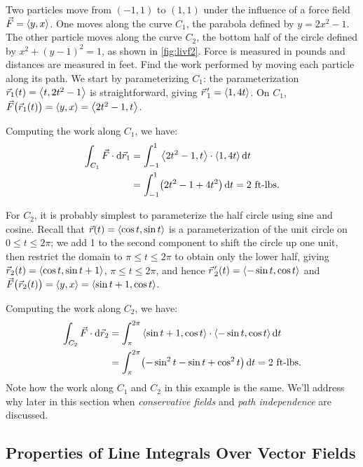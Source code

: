 \begin{example}\label{ex_livf2}%
Two particles move from $(-1,1)$ to $(1,1)$ under the influence of a force field $\vec F =\left\langle y,x\right\rangle$. One moves along the curve $C_1$, the parabola defined by $y = 2x^2-1$. The other particle moves along the curve $C_2$, the bottom half of the circle defined by $x^2+(y-1)^2=1$, as shown in \autoref{fig:livf2}. Force is measured in pounds and distances are measured in feet. Find the work performed by moving each particle along its path.
\solution
We start by parameterizing $C_1$: the parameterization $\vec r_1(t) =\left\langle t,2t^2-1\right\rangle$ is straightforward, giving $\vec r\hskip1.25pt '_1 =\left\langle 1,4t\right\rangle$. On $C_1$, $\vec F\bigl(\vec r_1(t)\bigr) =\left\langle y,x\right\rangle=\left\langle 2t^2-1,t\right\rangle$.

Computing the work along $C_1$, we have:
\begin{align*}
	\int_{C_1} \vec F\cdot\operatorname{d}\!\vec r_1
	& = \int_{-1}^1\left\langle 2t^2-1,t\right\rangle\cdot\left\langle 1,4t\right\rangle\operatorname{d}\! t \\
	&= \int_{-1}^1 \bigl(2t^2-1+4t^2\bigr)\operatorname{d}\! t = 2 \text{ ft-lbs}.
\end{align*}

For $C_2$, it is probably simplest to parameterize the half circle using sine and cosine. Recall that $\vec r(t) =\left\langle \cos t,\sin t\right\rangle$ is a parameterization of the unit circle on $0\leq t\leq 2\pi$; we add 1 to the second component to shift the circle up one unit, then restrict the domain to $\pi\leq t\leq 2\pi$  to obtain only the lower half, giving $\vec r_2(t) =\left\langle \cos t,\sin t+1\right\rangle$, $\pi\leq t\leq 2\pi$, and hence $\vec r\hskip1.25pt '_2(t) =\left\langle -\sin t,\cos t\right\rangle$ and $\vec F\bigl(\vec r_2(t)\bigr) =\left\langle y,x\right\rangle=\left\langle \sin t+1,\cos t\right\rangle$.

Computing the work along $C_2$, we have:
\begin{align*}
	\int_{C_2} \vec F\cdot\operatorname{d}\!\vec r_2
	& = \int_{\pi}^{2\pi}\left\langle \sin t+1,\cos t\right\rangle\cdot\left\langle -\sin t,\cos t\right\rangle\operatorname{d}\! t \\
	&= \int_{\pi}^{2\pi} \bigl(-\sin^2t-\sin t+\cos^2t\bigr)\operatorname{d}\! t = 2 \text{ ft-lbs}.
\end{align*}
Note how the work along $C_1$ and $C_2$ in this example is the same. We'll address why later in this section when \emph{conservative fields} and \emph{path independence} are discussed.
\end{example}

\subsection{Properties of Line Integrals Over Vector Fields}

